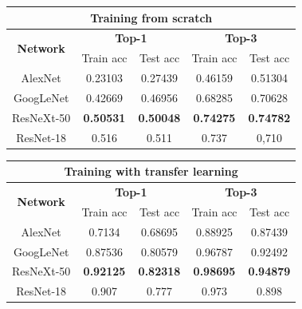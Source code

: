 \documentclass{article}
\begin{document}
\begin{table}[]
	\begin{tabular}{|c|c|c|c|c|}
		\hline
		\multicolumn{5}{|c|}{\textbf{Training from scratch}}                                                          \\ \hline
		\multirow{2}{*}{\textbf{Network}} & \multicolumn{2}{c|}{\textbf{Top-1}} & \multicolumn{2}{c|}{\textbf{Top-3}} \\ \cline{2-5} 
		& Train acc        & Test acc         & Train acc        & Test acc         \\ \hline
		AlexNet                           & 0.23103          & 0.27439          & 0.46159          & 0.51304          \\ \hline
		GoogLeNet                         & 0.42669          & 0.46956          & 0.68285          & 0.70628          \\ \hline
		ResNeXt-50                        & \textbf{0.50531} & \textbf{0.50048} & \textbf{0.74275} & \textbf{0.74782} \\ \hline
		ResNet-18 \cite{ArtistIdCNN406}                    & 0.516            & 0.511            & 0.737            & 0,710            \\ \hline
	\end{tabular}
	\begin{tabular}{|c|c|c|c|c|}
		\hline
		\multicolumn{5}{|c|}{\textbf{Training with transfer learning}}                                                           \\ \hline
		\multirow{2}{*}{\textbf{Network}} & \multicolumn{2}{c|}{\textbf{Top-1}}  & \multicolumn{2}{c|}{\textbf{Top-3}} \\ \cline{2-5} 
		& Train acc        & Test acc          & Train acc         & Test acc        \\ \hline
		AlexNet                           & 0.7134           & 0.68695           & 0.88925           & 0.87439         \\ \hline
		GoogLeNet                         & 0.87536          & 0.80579           & 0.96787           & 0.92492         \\ \hline
		ResNeXt-50                        & \textbf{0.92125} & \textbf{0.82318} & \textbf{0.98695}  & \textbf{0.94879} \\ \hline
		ResNet-18 \cite{ArtistIdCNN406}                    & 0.907            & 0.777             & 0.973             & 0.898           \\ \hline
	\end{tabular}
\end{table}
\end{document}
